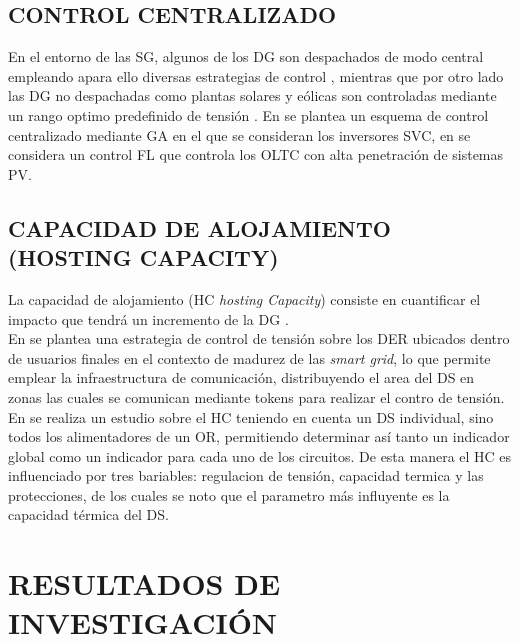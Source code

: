 \documentclass[12pt, letterpaper]{report}
\begin{document}
\section{CONTROL CENTRALIZADO}
En el entorno de las \ac{SG}, algunos de los  \ac{DG} son despachados de modo central empleando apara ello diversas estrategias de control , mientras que por otro lado las \ac{DG} no despachadas como plantas solares y eólicas son controladas mediante un rango optimo predefinido de tensión \cite{Vandoorn2013} \cite{colak2015survey}.
En \cite{Oshiro2011a} se plantea un esquema de control centralizado mediante \ac{GA}  en el que se consideran los inversores SVC,  en \cite{Shalwala2011a} se considera un control \ac{FL} que controla los \ac{OLTC}  con alta penetración de sistemas \ac{PV}.

\section{CAPACIDAD DE ALOJAMIENTO (HOSTING CAPACITY)}	
La capacidad de alojamiento (HC \textit{hosting Capacity}) consiste en cuantificar el impacto que tendrá un incremento de la DG \cite{Bollen2008}.\\
En \cite{Caldon2015a} se plantea una estrategia de control de tensión sobre los DER ubicados dentro  de usuarios finales en el contexto de madurez de las \textit{smart grid}, lo que permite emplear la infraestructura de comunicación, distribuyendo el area del \ac{DS} en zonas las cuales se comunican mediante tokens para realizar el contro de tensión.\\
En \cite{Rylander2016a} se realiza un estudio sobre el HC teniendo en cuenta un \ac{DS} individual,  sino todos los alimentadores de un OR, permitiendo determinar  así tanto un indicador global como un indicador para cada uno de los circuitos.  De esta manera el HC es influenciado por tres bariables: regulacion de tensión, capacidad termica  y las protecciones, de los cuales se noto que el parametro más influyente es la capacidad térmica del \ac{DS}.

\chapter{RESULTADOS DE INVESTIGACIÓN}
\label{cap:resultados}



%
\end{document}
